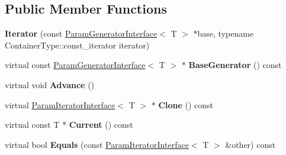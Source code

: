 \subsection*{Public Member Functions}
\begin{DoxyCompactItemize}
\item 
\mbox{\label{classtesting_1_1internal_1_1_values_in_iterator_range_generator_1_1_iterator_aebd635efe7082e6fc45bb8ae0dbefd2e}} 
{\bfseries Iterator} (const \mbox{\hyperlink{classtesting_1_1internal_1_1_param_generator_interface}{Param\+Generator\+Interface}}$<$ T $>$ $\ast$base, typename Container\+Type\+::const\+\_\+iterator iterator)
\item 
\mbox{\label{classtesting_1_1internal_1_1_values_in_iterator_range_generator_1_1_iterator_a9095d3846a3eae6673e948d9c1fcd818}} 
virtual const \mbox{\hyperlink{classtesting_1_1internal_1_1_param_generator_interface}{Param\+Generator\+Interface}}$<$ T $>$ $\ast$ {\bfseries Base\+Generator} () const
\item 
\mbox{\label{classtesting_1_1internal_1_1_values_in_iterator_range_generator_1_1_iterator_a49e0c9d26983eb8c76cc9c8ac4469dbf}} 
virtual void {\bfseries Advance} ()
\item 
\mbox{\label{classtesting_1_1internal_1_1_values_in_iterator_range_generator_1_1_iterator_a61476fb91ef8307b8f3b9c48832a307c}} 
virtual \mbox{\hyperlink{classtesting_1_1internal_1_1_param_iterator_interface}{Param\+Iterator\+Interface}}$<$ T $>$ $\ast$ {\bfseries Clone} () const
\item 
\mbox{\label{classtesting_1_1internal_1_1_values_in_iterator_range_generator_1_1_iterator_a37b25780b27c16195042003eaa1a286a}} 
virtual const T $\ast$ {\bfseries Current} () const
\item 
\mbox{\label{classtesting_1_1internal_1_1_values_in_iterator_range_generator_1_1_iterator_aff9f8c1c01a4e708235d8793b2c44d31}} 
virtual bool {\bfseries Equals} (const \mbox{\hyperlink{classtesting_1_1internal_1_1_param_iterator_interface}{Param\+Iterator\+Interface}}$<$ T $>$ \&other) const
\end{DoxyCompactItemize}

